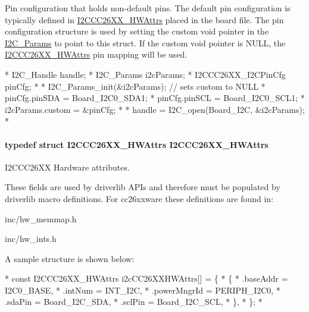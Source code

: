 Pin configuration that holds non-\/default pins. The default pin configuration is typically defined in \hyperlink{struct_i2_c_c_c26_x_x___h_w_attrs}{I2\-C\-C\-C26\-X\-X\-\_\-\-H\-W\-Attrs} placed in the board file. The pin configuration structure is used by setting the custom void pointer in the \hyperlink{struct_i2_c___params}{I2\-C\-\_\-\-Params} to point to this struct. If the custom void pointer is N\-U\-L\-L, the \hyperlink{struct_i2_c_c_c26_x_x___h_w_attrs}{I2\-C\-C\-C26\-X\-X\-\_\-\-H\-W\-Attrs} pin mapping will be used. 
\begin{DoxyCode}
*  I2C_Handle handle;
*  I2C_Params i2cParams;
*  I2CCC26XX_I2CPinCfg pinCfg;
*
*  I2C_Params_init(&i2cParams);     \textcolor{comment}{// sets custom to NULL}
*  pinCfg.pinSDA = Board\_I2C0\_SDA1;
*  pinCfg.pinSCL = Board\_I2C0\_SCL1;
*  i2cParams.custom = &pinCfg;
*
*  handle = I2C_open(Board\_I2C, &i2cParams);
*  
\end{DoxyCode}
\paragraph[{I2\-C\-C\-C26\-X\-X\-\_\-\-H\-W\-Attrs}]{\setlength{\rightskip}{0pt plus 5cm}typedef struct {\bf I2\-C\-C\-C26\-X\-X\-\_\-\-H\-W\-Attrs}  {\bf I2\-C\-C\-C26\-X\-X\-\_\-\-H\-W\-Attrs}}\label{_i2_c_c_c26_x_x_8h_ab3c00c0267b7eb96f1459bfb823bdd79}


I2\-C\-C\-C26\-X\-X Hardware attributes. 

These fields are used by driverlib A\-P\-Is and therefore must be populated by driverlib macro definitions. For cc26xxware these definitions are found in\-:
\begin{DoxyItemize}
\item inc/hw\-\_\-memmap.\-h
\item inc/hw\-\_\-ints.\-h
\end{DoxyItemize}

A sample structure is shown below\-: 
\begin{DoxyCode}
*  \textcolor{keyword}{const} I2CCC26XX_HWAttrs i2cCC26XXHWAttrs[] = \{
*      \{
*         .baseAddr = I2C0\_BASE,
*         .intNum = INT\_I2C,
*         .powerMngrId = PERIPH\_I2C0,
*         .sdaPin = Board\_I2C\_SDA,
*         .sclPin = Board\_I2C\_SCL,
*      \},
*  \};
*  
\end{DoxyCode}
